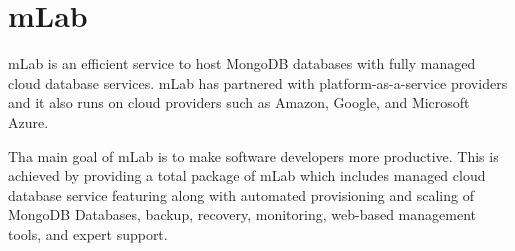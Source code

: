 \section{mLab}

mLab is an efficient service to host MongoDB databases with fully managed cloud
database services. mLab has partnered with platform-as-a-service providers and
it also runs on cloud providers such as Amazon, Google, and Microsoft Azure.

Tha main goal of mLab is to make software developers more productive.  This is
achieved by providing a total package of mLab which includes managed cloud
database service featuring along with automated provisioning and scaling of
MongoDB Databases, backup, recovery, monitoring, web-based management tools,
and expert support. \cite{mLab}